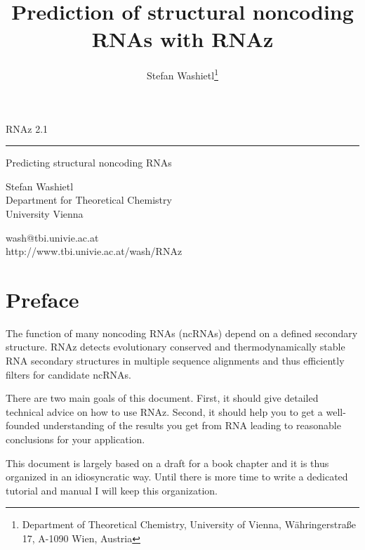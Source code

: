 \documentclass[11pt]{article}
\begin{document}
\title{Prediction of structural noncoding RNAs with RNAz} 
\author{Stefan Washietl\footnote{Department of Theoretical Chemistry, University of
  Vienna, W{\"a}hringerstra{\ss}e 17, A-1090 Wien, Austria}} 

\thispagestyle{empty}

\vspace*{5cm}

\huge 
\sf

RNAz 2.1

\vspace*{-0.8cm}
\rule{\textwidth}{1mm}

\large
\vspace*{-0.3cm}
\hfill Predicting structural noncoding RNAs

\vspace{3cm}

\vfill

Stefan Washietl\\Department for Theoretical
Chemistry\\University Vienna

wash@tbi.univie.ac.at\\
http://www.tbi.univie.ac.at/\raisebox{-0.9ex}{\~{ }}wash/RNAz

\normalfont

\newpage
{}
\tableofcontents
\newpage


\section*{Preface}

The function of many noncoding RNAs (ncRNAs) depend on a defined secondary
structure. RNAz detects evolutionary conserved and thermodynamically stable
RNA secondary structures in multiple sequence alignments and thus
efficiently filters for candidate ncRNAs.

There are two main goals of this document. First, it should give
detailed technical advice on how to use RNAz. Second, it should help
you to get a well-founded understanding of the results you get from
RNA leading to reasonable conclusions for your application.

This document is largely based on a draft for a book chapter and it is
thus organized in an idiosyncratic way. Until there is more time to
write a dedicated tutorial and manual I will keep this organization.
\end{document}
